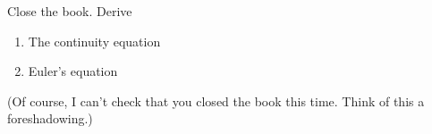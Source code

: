 
  Close the book.  Derive
  \begin{enumerate}
      \item {} The continuity equation
      \item {} Euler's equation
  \end{enumerate}
  (Of course, I can't check that you closed the book this time. Think of this a
  foreshadowing.)

